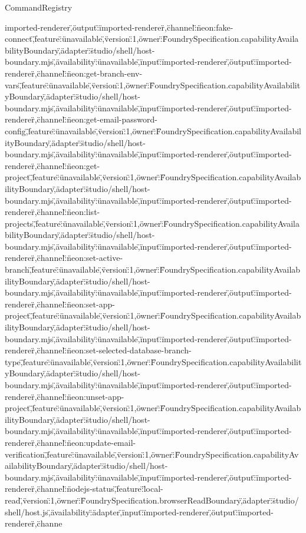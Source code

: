 \begin{lexlean}{CommandRegistry}
\begin{semanticmodule}
{imported-renderer\",\"output\":\"imported-renderer\"},{\"channel\":\"neon:fake-connect\",\"feature\":\"unavailable\",\"version\":1,\"owner\":\"FoundrySpecification.capabilityAvailabilityBoundary\",\"adapter\":\"studio/shell/host-boundary.mjs\",\"availability\":\"unavailable\",\"input\":\"imported-renderer\",\"output\":\"imported-renderer\"},{\"channel\":\"neon:get-branch-env-vars\",\"feature\":\"unavailable\",\"version\":1,\"owner\":\"FoundrySpecification.capabilityAvailabilityBoundary\",\"adapter\":\"studio/shell/host-boundary.mjs\",\"availability\":\"unavailable\",\"input\":\"imported-renderer\",\"output\":\"imported-renderer\"},{\"channel\":\"neon:get-email-password-config\",\"feature\":\"unavailable\",\"version\":1,\"owner\":\"FoundrySpecification.capabilityAvailabilityBoundary\",\"adapter\":\"studio/shell/host-boundary.mjs\",\"availability\":\"unavailable\",\"input\":\"imported-renderer\",\"output\":\"imported-renderer\"},{\"channel\":\"neon:get-project\",\"feature\":\"unavailable\",\"version\":1,\"owner\":\"FoundrySpecification.capabilityAvailabilityBoundary\",\"adapter\":\"studio/shell/host-boundary.mjs\",\"availability\":\"unavailable\",\"input\":\"imported-renderer\",\"output\":\"imported-renderer\"},{\"channel\":\"neon:list-projects\",\"feature\":\"unavailable\",\"version\":1,\"owner\":\"FoundrySpecification.capabilityAvailabilityBoundary\",\"adapter\":\"studio/shell/host-boundary.mjs\",\"availability\":\"unavailable\",\"input\":\"imported-renderer\",\"output\":\"imported-renderer\"},{\"channel\":\"neon:set-active-branch\",\"feature\":\"unavailable\",\"version\":1,\"owner\":\"FoundrySpecification.capabilityAvailabilityBoundary\",\"adapter\":\"studio/shell/host-boundary.mjs\",\"availability\":\"unavailable\",\"input\":\"imported-renderer\",\"output\":\"imported-renderer\"},{\"channel\":\"neon:set-app-project\",\"feature\":\"unavailable\",\"version\":1,\"owner\":\"FoundrySpecification.capabilityAvailabilityBoundary\",\"adapter\":\"studio/shell/host-boundary.mjs\",\"availability\":\"unavailable\",\"input\":\"imported-renderer\",\"output\":\"imported-renderer\"},{\"channel\":\"neon:set-selected-database-branch-type\",\"feature\":\"unavailable\",\"version\":1,\"owner\":\"FoundrySpecification.capabilityAvailabilityBoundary\",\"adapter\":\"studio/shell/host-boundary.mjs\",\"availability\":\"unavailable\",\"input\":\"imported-renderer\",\"output\":\"imported-renderer\"},{\"channel\":\"neon:unset-app-project\",\"feature\":\"unavailable\",\"version\":1,\"owner\":\"FoundrySpecification.capabilityAvailabilityBoundary\",\"adapter\":\"studio/shell/host-boundary.mjs\",\"availability\":\"unavailable\",\"input\":\"imported-renderer\",\"output\":\"imported-renderer\"},{\"channel\":\"neon:update-email-verification\",\"feature\":\"unavailable\",\"version\":1,\"owner\":\"FoundrySpecification.capabilityAvailabilityBoundary\",\"adapter\":\"studio/shell/host-boundary.mjs\",\"availability\":\"unavailable\",\"input\":\"imported-renderer\",\"output\":\"imported-renderer\"},{\"channel\":\"nodejs-status\",\"feature\":\"local-read\",\"version\":1,\"owner\":\"FoundrySpecification.browserReadBoundary\",\"adapter\":\"studio/shell/host.js\",\"availability\":\"adapter\",\"input\":\"imported-renderer\",\"output\":\"imported-renderer\"},{\"channe}
\end{semanticmodule}
\end{lexlean}
